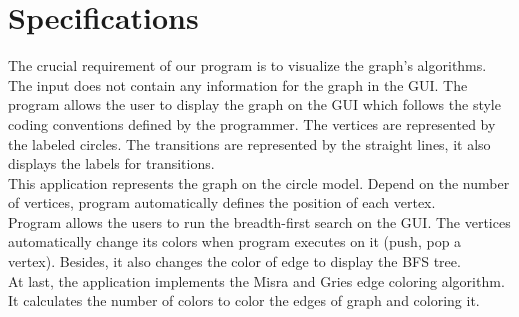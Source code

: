 \section{Specifications}
The crucial requirement of our program is to visualize the graph's algorithms. The input does not contain any information for the graph in the GUI. The program allows the user to display the graph on the GUI which follows the style coding conventions defined by the programmer. The vertices are represented by the labeled circles. The transitions are represented by the straight lines, it also displays the labels for transitions.
\\[0.5cm]
This application represents the graph on the circle model. Depend on the number of vertices, program automatically defines the position of each vertex.
\\[0.5cm]
Program allows the users to run the breadth-first search on the GUI. The vertices automatically change its colors when program executes on it (push, pop a vertex). Besides, it also changes the color of edge to display the BFS tree.
\\[0.5cm]
At last, the application implements the Misra and Gries edge coloring algorithm. It calculates the number of colors to color the edges of graph and coloring it.